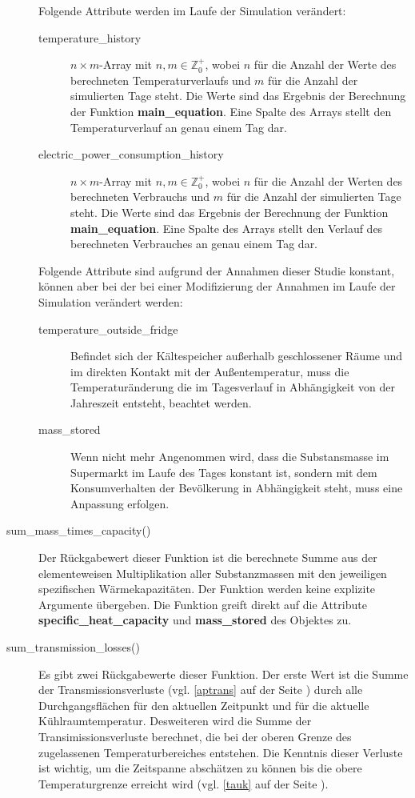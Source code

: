 \begin{description}
	Folgende Attribute werden im Laufe der Simulation ver\"andert:
	\begin{description}
		\item[temperature\_history] $n \times m$-Array mit $n,m\in
		\mathbb{Z}^+_0$, wobei $n$ f\"ur die Anzahl der Werte des
		berechneten Temperaturverlaufs und $m$ f\"ur die Anzahl der
		simulierten Tage steht. Die Werte sind das Ergebnis der
		Berechnung der Funktion \textbf{main\_equation}. Eine Spalte des
		Arrays stellt den Temperaturverlauf an genau einem Tag dar.
		\item[electric\_power\_consumption\_history] $n \times m$-Array
		mit $n,m\in \mathbb{Z}^+_0$, wobei $n$ f\"ur die Anzahl der
		Werten des berechneten Verbrauchs und $m$ f\"ur die Anzahl der
		simulierten Tage steht. Die Werte sind das Ergebnis der
		Berechnung der Funktion \textbf{main\_equation}. Eine Spalte
		des Arrays stellt den Verlauf des berechneten Verbrauches an
		genau einem Tag dar.
	\end{description}

	Folgende Attribute sind aufgrund der Annahmen dieser Studie konstant,
	k\"onnen aber bei der bei einer Modifizierung der Annahmen im Laufe der
	Simulation ver\"andert werden:
	\begin{description}
		\item[temperature\_outside\_fridge] Befindet sich der
		K\"altespeicher au\ss erhalb geschlossener R\"aume und im
		direkten Kontakt mit der Au\ss entemperatur, muss die
		Temperatur\"anderung die im Tagesverlauf in Abh\"angigkeit von
		der Jahreszeit entsteht, beachtet werden.
		\item[mass\_stored] Wenn nicht mehr Angenommen wird, dass
		die Substansmasse im Supermarkt im Laufe des Tages konstant ist,
		sondern mit dem Konsumverhalten der Bev\"olkerung in
		Abh\"angigkeit steht, muss eine Anpassung erfolgen.
	\end{description}

	\item[sum\_mass\_times\_capacity()] Der R\"uckgabewert dieser Funktion
	ist die berechnete Summe aus der elementeweisen Multiplikation aller
	Substanzmassen mit den jeweiligen spezifischen W\"armekapazit\"aten. Der
	Funktion werden keine explizite Argumente \"ubergeben. Die Funktion
	greift direkt auf die Attribute \textbf{specific\_heat\_capacity} und
	\textbf{mass\_stored} des Objektes zu.

	\item[sum\_transmission\_losses()] Es gibt zwei R\"uckgabewerte dieser
	Funktion. Der erste Wert ist die Summe der Transmissionsverluste (vgl.
	\cref{aptrans} auf der Seite \pageref{ptrans}) durch alle
	Durchgangsfl\"achen f\"ur den aktuellen Zeitpunkt und f\"ur die aktuelle
	K\"uhlraumtemperatur. Desweiteren wird die Summe der
	Transimissionsverluste berechnet, die bei der oberen Grenze des
	zugelassenen Temperaturbereiches entstehen. Die Kenntnis dieser Verluste
	ist wichtig, um die Zeitspanne absch\"atzen zu k\"onnen bis die obere
	Temperaturgrenze erreicht wird (vgl. \cref{tauk} auf der Seite
	\pageref{tauk}).


\end{description}
